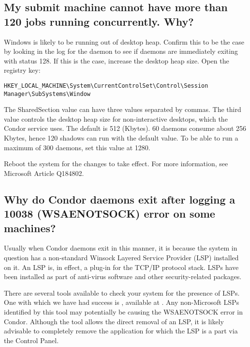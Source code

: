 \subsection*{My submit machine cannot have more than 120 jobs running concurrently. Why?}

Windows is likely to be running out of desktop heap. 
Confirm this to be the case
by looking in the log for the  daemon
to see if  daemons are immediately
exiting with status 128.
If this is the case, increase the desktop heap size.
Open the registry key:

\footnotesize
\begin{verbatim}
HKEY_LOCAL_MACHINE\System\CurrentControlSet\Control\Session Manager\SubSystems\Window
\end{verbatim}
\normalsize

The SharedSection value can have three values separated by commas.
The third value controls the desktop heap size for non-interactive desktops,
which the Condor service uses.
The default is 512 (Kbytes).
60  daemons consume about 256 Kbytes,
hence 120 shadows can run with the default value.
To be able to run a maximum of 300  daemons,
set this value at 1280.

Reboot the system for the changes to take effect.
For more information,
see Microsoft Article Q184802.

\subsection*{Why do Condor daemons exit after logging a 10038 (WSAENOTSOCK) error on some machines?}

Usually when Condor daemons exit in this manner, it is because the system in
question has a non-standard Winsock Layered Service Provider (LSP) installed
on it. An LSP is, in effect, a plug-in for the TCP/IP protocol stack.
LSPs have been 
installed as part of anti-virus software and other security-related
packages.

There are several tools available to check your system for the
presence of LSPs. One with which we have had success is ,
available at .
Any non-Microsoft LSPs identified by
this tool may potentially be causing the WSAENOTSOCK error in Condor.
Although the  tool allows the direct removal of an LSP,
it is likely advisable to completely remove the application for which
the LSP is a part via the Control Panel.

